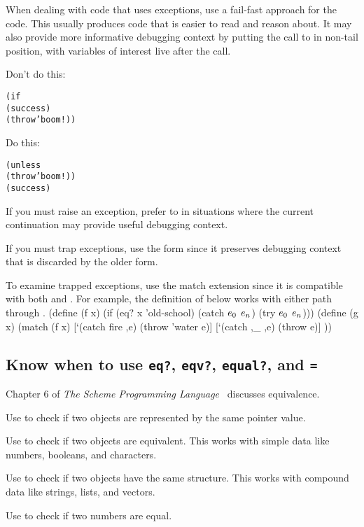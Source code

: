 \documentclass[letterpaper,11pt,twoside,final]{article}
\begin{document}
When dealing with code that uses exceptions, use a fail-fast approach
for the code. This usually produces code that is easier to read and
reason about.
It may also provide more informative debugging context by putting
the call to  in non-tail position, with variables of
interest live after the call.

Don't do this:
\antipar
\begin{alltt}
(if 
    (success)
    (throw 'boom!))
\end{alltt}

Do this:
\antipar
\begin{alltt}
(unless 
  (throw 'boom!))
(success)
\end{alltt}

If you must raise an exception, prefer  to  in
situations where the current continuation may provide useful debugging
context.

If you must trap exceptions, use the  form since it preserves
debugging context that is discarded by the older  form.

To examine trapped exceptions, use the  match extension since
it is compatible with both  and .
For example, the definition of  below works with either
path through .
\codebegin
(define (f x)
  (if (eq? x 'old-school)
      (catch \(e\sb{0}\) \etc \(e\sb{n}\))
      (try \(e\sb{0}\) \etc \(e\sb{n}\))))
(define (g x)
  (match (f x)
    [`(catch fire ,e) (throw 'water e)]
    [`(catch ,_ ,e) (throw e)]
    \etc))
\codeend

\subsection* {Know when to use \texttt{eq?}, \texttt{eqv?},
  \texttt{equal?}, and \texttt{=}}

Chapter 6 of \emph{The Scheme Programming
  Language}~\cite{the-scheme-programming-language} discusses
equivalence.

Use  to check if two objects are represented by the same
pointer value.

Use  to check if two objects are equivalent. This works
with simple data like numbers, booleans, and characters.

Use  to check if two objects have the same
structure. This works with compound data like strings, lists, and
vectors.

Use \code{=} to check if two numbers are equal.
\end{document}
